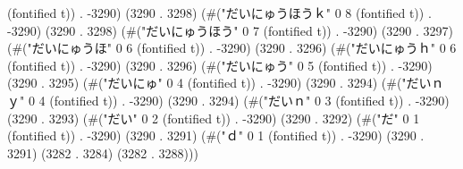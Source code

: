 (fontified t)) . -3290) (3290 . 3298) (#("だいにゅうほうｋ" 0 8 (fontified t)) . -3290) (3290 . 3298) (#("だいにゅうほう" 0 7 (fontified t)) . -3290) (3290 . 3297) (#("だいにゅうほ" 0 6 (fontified t)) . -3290) (3290 . 3296) (#("だいにゅうｈ" 0 6 (fontified t)) . -3290) (3290 . 3296) (#("だいにゅう" 0 5 (fontified t)) . -3290) (3290 . 3295) (#("だいにゅ" 0 4 (fontified t)) . -3290) (3290 . 3294) (#("だいｎｙ" 0 4 (fontified t)) . -3290) (3290 . 3294) (#("だいｎ" 0 3 (fontified t)) . -3290) (3290 . 3293) (#("だい" 0 2 (fontified t)) . -3290) (3290 . 3292) (#("だ" 0 1 (fontified t)) . -3290) (3290 . 3291) (#("ｄ" 0 1 (fontified t)) . -3290) (3290 . 3291) (3282 . 3284) (3282 . 3288)))
